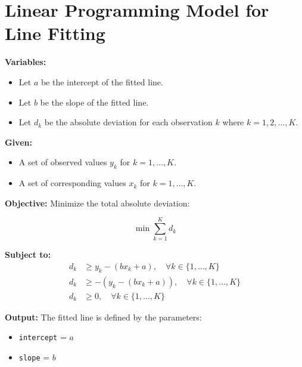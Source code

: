 \documentclass{article}
\begin{document}
\section*{Linear Programming Model for Line Fitting}

\textbf{Variables:}
\begin{itemize}
    \item Let \( a \) be the intercept of the fitted line.
    \item Let \( b \) be the slope of the fitted line.
    \item Let \( d_k \) be the absolute deviation for each observation \( k \) where \( k = 1, 2, \ldots, K \).
\end{itemize}

\textbf{Given:}
\begin{itemize}
    \item A set of observed values \( y_k \) for \( k = 1, \ldots, K \).
    \item A set of corresponding values \( x_k \) for \( k = 1, \ldots, K \).
\end{itemize}

\textbf{Objective:}  
Minimize the total absolute deviation:

\[
\min \sum_{k=1}^{K} d_k
\]

\textbf{Subject to:}
\begin{align*}
d_k & \geq y_k - (b x_k + a), \quad \forall k \in \{1, \ldots, K\} \\
d_k & \geq -(y_k - (b x_k + a)), \quad \forall k \in \{1, \ldots, K\} \\
d_k & \geq 0, \quad \forall k \in \{1, \ldots, K\}
\end{align*}

\textbf{Output:}  
The fitted line is defined by the parameters:
\begin{itemize}
    \item \texttt{intercept} = \( a \)
    \item \texttt{slope} = \( b \)
\end{itemize}
\end{document}

